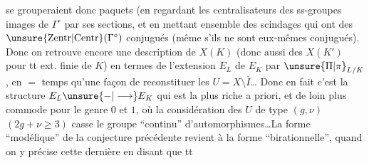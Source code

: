 se grouperaient donc   paquets
(en regardant les centralisateurs des ss-groupes
images de $\Gamma^\circ$ par ses sections,\deleted{)} et en
mettant ensemble des scindages qui ont des
$\unsure{\mathrm{Zentr}|\mathrm{Centr}}(\Gamma^\circ)$ conjugués (même s'ils ne sont
eux-mêmes conjugués). Donc on retrouve
encore une description de $X(K)$ (donc
aussi des $X(K')$ pour tt ext. finie  de $K$)
en termes de l'extension $E_L$ de $E_K$ par
$\unsure{\Pi|\pi}_{L/K}$, en $=$ temps qu'une façon de
reconstituer les $U=X\setminus\bar I$\ldots
Donc en fait c'est la structure $E_L\unsure{-|\longrightarrow}E_K$
qui est la plus riche a priori, et de
loin plus commode pour le genre $0$ et $1$,
où la considération des $U$ de type $(g,\nu)$
$(2g+\nu\geq3)$ casse le groupe ``continu''
d'automorphismes\ldots La forme ``modélique''
de la conjecture précédente revient
à la forme ``birationnelle'', quand on y
précise cette dernière en disant que tt

